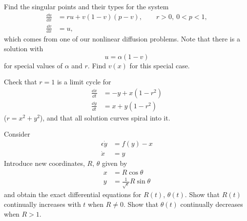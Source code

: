 \begin{Exercise}
  Find the singular points and their types for the system
  \begin{align*}
    \frac{\dd u}{\dd x} &= r u + v (1-v)(p-v), \qquad r > 0, \ 0 < p < 1, \\
    \frac{\dd v}{\dd x} &= u,
  \end{align*}
  which comes from one of our nonlinear diffusion problems.  
  Note that there is a solution with
  \[ 
  u = \alpha (1-v) 
  \]
  for special values of $\alpha$ and $r$.  
  Find $v(x)$ for this special case.
\end{Exercise}



\begin{Exercise}
  Check that $r=1$ is a limit cycle for
  \begin{align*}
    \frac{\dd x}{\dd t} &= -y + x(1-r^2) \\
    \frac{\dd y}{\dd t} &= x + y(1-r^2)
  \end{align*}
  ($r=x^2+y^2$), and that all solution curves spiral into it.
\end{Exercise}



\begin{Exercise}
  Consider
  \begin{align*}
    \epsilon \dot{y} &= f(y) - x \\
    \dot{x} &= y
  \end{align*}
  Introduce new coordinates, $R$, $\theta$ given by
  \begin{align*}
    x &= R \cos \theta \\
    y &= \frac{1}{\sqrt{\epsilon}} R \sin \theta
  \end{align*}
  and obtain the exact differential equations for $R(t)$, $\theta(t)$.
  Show that $R(t)$ continually increases with $t$ when $R \neq 0$.
  Show that $\theta(t)$ continually decreases when $R > 1$.
\end{Exercise}



